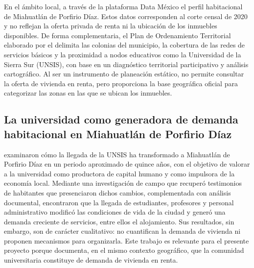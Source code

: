 En el ámbito local,  a través de la plataforma Data México  el perfil habitacional de Miahuatlán de Porfirio Díaz.
Estos datos corresponden al corte censal de 2020 y no reflejan la oferta privada de renta ni la ubicación de los inmuebles disponibles. De forma complementaria, el Plan de Ordenamiento Territorial elaborado por el \textcite{SEINFRA2024} delimita las colonias del municipio, la cobertura de las redes de servicios básicos y la proximidad a nodos educativos como la Universidad de la Sierra Sur (UNSIS), con base en un diagnóstico territorial participativo y análisis cartográfico. Al ser un instrumento de planeación estático, no permite consultar la oferta de vivienda en renta, pero proporciona la base geográfica oficial para categorizar las zonas en las que se ubican los inmuebles.

\subsection{La universidad como generadora de demanda habitacional en Miahuatlán de Porfirio Díaz}

\textcite{ZepedaGarcia2019} examinaron cómo la llegada de la UNSIS ha transformado a Miahuatlán de Porfirio Díaz en un periodo aproximado de quince años, con el objetivo de valorar a la universidad como productora de capital humano y como impulsora de la economía local. Mediante una investigación de campo que recuperó testimonios de habitantes que presenciaron dichos cambios, complementada con análisis documental, encontraron que la llegada de estudiantes, profesores y personal administrativo modificó las condiciones de vida de la ciudad y generó una demanda creciente de servicios, entre ellos el alojamiento. Sus resultados, sin embargo, son de carácter cualitativo: no cuantifican la demanda de vivienda ni proponen mecanismos para organizarla. Este trabajo es relevante para el presente proyecto porque documenta, en el mismo contexto geográfico, que la comunidad universitaria constituye  de demanda de vivienda en renta.

